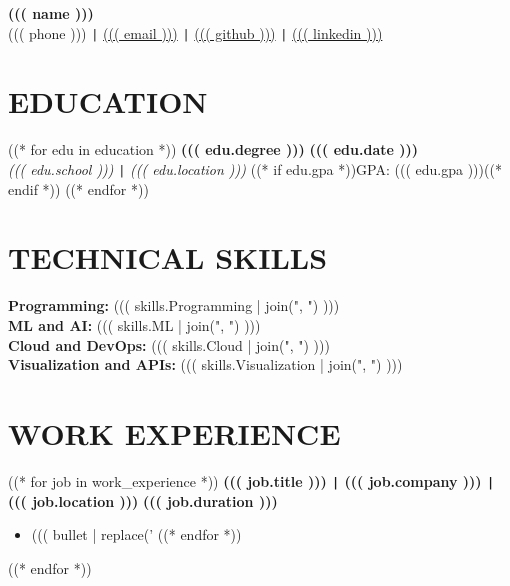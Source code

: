 \documentclass[10pt]{article}
\begin{document}
\begin{center}
    \textbf{\fontsize{18}{18}\selectfont ((( name )))} \\
    ((( phone ))) \texttt{|} \href{mailto:((( email )))}{((( email )))} \texttt{|}
    \href{((( github )))}{((( github )))} \texttt{|}  
    \href{((( linkedin )))}{((( linkedin )))}
\end{center}

\vspace{-0.7cm}
\section*{EDUCATION} 
\vspace{-0.2cm} 
((* for edu in education *))
\noindent 
\textbf{((( edu.degree )))} \hfill \textbf{((( edu.date )))} \\
\textit{((( edu.school )))} \texttt{|} \textit{((( edu.location )))} ((* if edu.gpa *))\hfill GPA: ((( edu.gpa )))((* endif *))
((* endfor *))

\vspace{-0.4cm} 
\section*{TECHNICAL SKILLS} 
\vspace{-0.2cm}
\noindent
\textbf{Programming:} ((( skills.Programming | join(", ") ))) \\
\textbf{ML and AI:} ((( skills.ML | join(", ") ))) \\
\textbf{Cloud and DevOps:} ((( skills.Cloud | join(", ") ))) \\
\textbf{Visualization and APIs:} ((( skills.Visualization | join(", ") )))

\vspace{-0.5cm}
\section*{WORK EXPERIENCE}
((* for job in work_experience *))
\vspace{-0.2cm}
\noindent
\textbf{((( job.title ))) \texttt{|} ((( job.company ))) \texttt{|} ((( job.location )))} \hfill \textbf{((( job.duration )))} 
\vspace{-0.15cm}
\begin{itemize}[leftmargin=0.5cm, itemsep=0pt]
((* for bullet in job.bullets *))
    \item ((( bullet | replace('%
((* endfor *))
\end{itemize}
((* endfor *))
\end{document}
